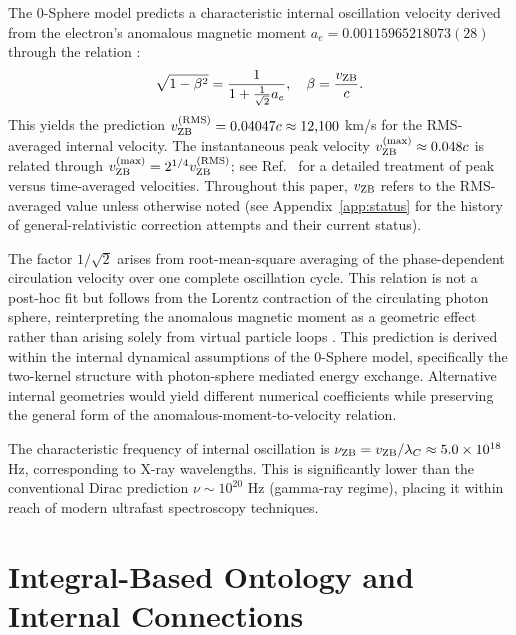 \documentclass[%
 reprint,
 amsmath,amssymb,
 aps,
 prb,
]{revtex4-2}
\numberwithin{equation}{section}
\begin{document}
The 0-Sphere model predicts a characteristic internal oscillation velocity derived from the electron's anomalous magnetic moment $a_e = 0.00115965218073(28)$ through the relation \cite{Hanamura2024Spin}:
\begin{equation}
\sqrt{1 - \beta^2} = \frac{1}{1 + \frac{1}{\sqrt{2}}a_e}, \quad \beta = \frac{v_{\rm ZB}}{c}.
\label{eq:anomalous_relation}
\end{equation}
This yields the prediction $v_{\rm ZB}^{\rm (RMS)} = 0.04047c \approx 12{,}100$ km/s for the RMS-averaged internal velocity. The instantaneous peak velocity $v_{\rm ZB}^{\rm (max)} \approx 0.048c$ is related through $v_{\rm ZB}^{\rm (max)} = 2^{1/4} v_{\rm ZB}^{\rm (RMS)}$; see Ref.~\cite{Hanamura2026NonPert} for a detailed treatment of peak versus time-averaged velocities. Throughout this paper, $v_{\rm ZB}$ refers to the RMS-averaged value unless otherwise noted (see Appendix~\ref{app:status} for the history of general-relativistic correction attempts and their current status).

The factor $1/\sqrt{2}$ arises from root-mean-square averaging of the phase-dependent circulation velocity over one complete oscillation cycle. This relation is not a post-hoc fit but follows from the Lorentz contraction of the circulating photon sphere, reinterpreting the anomalous magnetic moment as a geometric effect rather than arising solely from virtual particle loops \cite{Hanamura2026Geometrical}. This prediction is derived within the internal dynamical assumptions of the 0-Sphere model, specifically the two-kernel structure with photon-sphere mediated energy exchange. Alternative internal geometries would yield different numerical coefficients while preserving the general form of the anomalous-moment-to-velocity relation.

The characteristic frequency of internal oscillation is $\nu_{\rm ZB} = v_{\rm ZB}/\lambda_C \approx 5.0 \times 10^{18}$ Hz, corresponding to X-ray wavelengths. This is significantly lower than the conventional Dirac prediction $\nu \sim 10^{20}$ Hz (gamma-ray regime), placing it within reach of modern ultrafast spectroscopy techniques.


\section{Integral-Based Ontology and Internal Connections}
\label{sec:integral_ontology}
\end{document}

